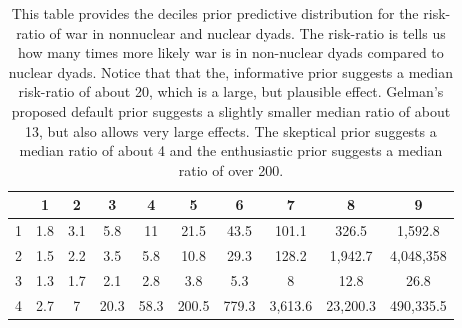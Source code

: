 \begin{table}[H]
\centering
{\scriptsize
\begin{tabular}{|cccccccccc|}
  \hline
 & 1 & 2 & 3 & 4 & 5 & 6 & 7 & 8 & 9 \\ 
  \hline
1 &       1.8 &       3.1 &       5.8 &        11 &      21.5 &      43.5 &     101.1 &     326.5 &   1,592.8 \\ 
  2 &       1.5 &       2.2 &       3.5 &       5.8 &      10.8 &      29.3 &     128.2 &   1,942.7 & 4,048,358 \\ 
  3 &       1.3 &       1.7 &       2.1 &       2.8 &       3.8 &       5.3 &         8 &      12.8 &      26.8 \\ 
  4 &       2.7 &         7 &      20.3 &      58.3 &     200.5 &     779.3 &   3,613.6 &  23,200.3 & 490,335.5 \\ 
   \hline
\end{tabular}
}
\caption{This table provides the deciles prior predictive distribution for the 
                  risk-ratio of war in nonnuclear and nuclear dyads. The risk-ratio is 
                  tells us how many times more likely war is in non-nuclear dyads compared 
                  to nuclear dyads. Notice that that the, informative prior suggests a median 
                  risk-ratio of about 20, which is a large, but plausible effect. Gelman's 
                  proposed default prior suggests a slightly smaller median ratio of about 13, 
                  but also allows very large effects. The skeptical prior suggests a median 
                  ratio of about 4 and the enthusiastic prior suggests a median ratio of over 
                  200.} 
\label{tab:bm-pppd-deciles}
\end{table}
